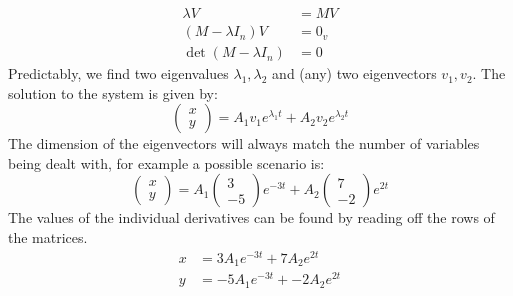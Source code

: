 \documentclass{scrartcl}
\begin{document}
\begin{equation}
\begin{split}
\lambda V & = MV \\
(M - \lambda I_{n})V & = 0_{v} \\
\det(M - \lambda I_{n}) & = 0
\end{split}
\end{equation}
Predictably, we find two eigenvalues $ \lambda_{1} ,  \lambda_{2} $ and (any) two eigenvectors $ v_{1},  v_{2} $. The solution to the system is given by:
\begin{equation}
\begin{pmatrix}
x \\
y
\end{pmatrix}
= A_{1}v_{1}e^{\lambda_{1}t} + A_{2}v_{2}e^{\lambda_{2}t}
\end{equation}
The dimension of the eigenvectors will always match the number of variables being dealt with, for example a possible scenario is:
\begin{equation}
\begin{pmatrix}
x \\
y
\end{pmatrix}
= A_{1}
\begin{pmatrix}
3 \\
-5
\end{pmatrix}
e^{-3t} + A_{2}
\begin{pmatrix}
7 \\
-2
\end{pmatrix}
e^{2t}
\end{equation}
The values of the individual derivatives can be found by reading off the rows of the matrices.
\begin{equation}
\begin{split}
x & = 3A_{1}e^{-3t} + 7A_{2}e^{2t} \\
y & = -5A_{1}e^{-3t} + -2A_{2}e^{2t}
\end{split}
\end{equation}
\end{document}
